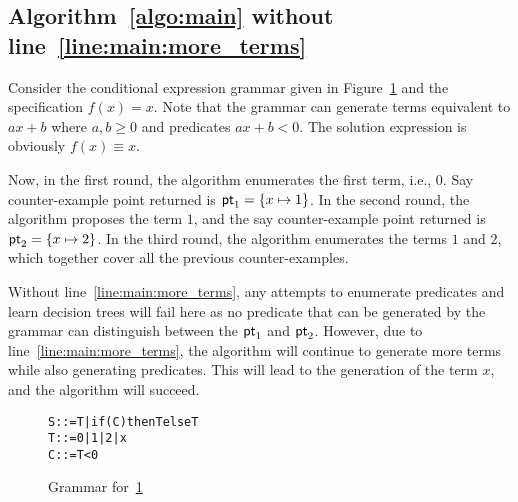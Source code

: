 \begin{appendices}
\section{Algorithm~\ref{algo:main} without line~\ref{line:main:more_terms}}
\label{sec:app:ex}

Consider the conditional expression grammar given in
Figure~\ref{fig:bad_grammar} and the specification $f(x) = x$.
Note that the grammar can generate terms equivalent to $ax + b$ where
$a, b \geq 0$ and predicates $ax + b < 0$.
The solution expression is obviously $f(x) \equiv x$.


Now, in the first round, the algorithm enumerates the first term, i.e.,
$0$.
Say counter-example point returned is $\mathsf{pt}_1 = \{ x \mapsto 1 \}$.
In the second round, the algorithm proposes the term $1$, and the
say counter-example point returned is $\mathsf{pt}_2 = \{ x \mapsto 2 \}$.
In the third round, the algorithm enumerates the terms $1$ and $2$,
which together cover all the previous counter-examples.

Without line~\ref{line:main:more_terms}, any attempts to enumerate
predicates and learn decision trees will fail here as no predicate that
can be generated by the grammar can distinguish between the $\mathsf{pt}_1$
and $\mathsf{pt}_2$.
However, due to line~\ref{line:main:more_terms}, the algorithm will
continue to generate more terms while also generating predicates.
This will lead to the generation of the term $x$, and the algorithm will
succeed.

\begin{figure}[!t]
\vspace*{3ex}
  \begin{alltt}
  \fontsize{9}{10}\selectfont
                      S ::= T | if (C) then T else T
                      T ::= 0 | 1 | 2 | x 
                      C ::= T < 0
\end{alltt}
\caption{Grammar for~\ref{sec:app:ex}}
  \label{fig:bad_grammar}
\end{figure}


\end{appendices}
